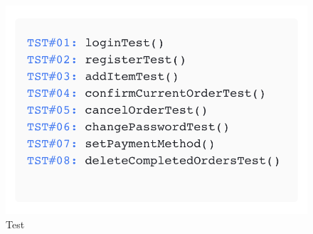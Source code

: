\documentclass{article}
\begin{document}
\begin{figure}[!h]
    \centering
    \includegraphics[width=0.75\linewidth]{imgs/Test.png}
    \caption{Test}
    \centering
    \label{Test}
\end{figure}

\newpage
\end{document}
